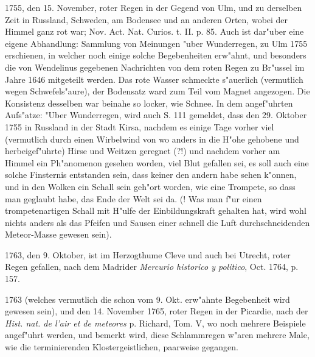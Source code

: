 \documentclass[a4paper, 11pt, oneside, polutonikogreek, german]{article}
\begin{document}
1755, den 15. November, roter Regen in der Gegend von Ulm, und zu derselben Zeit in Russland, Schweden, am Bodensee und an anderen Orten, wobei der Himmel ganz rot war; Nov. Act. Nat. Curios. t. II. p. 85. Auch ist dar"uber eine eigene Abhandlung: Sammlung von Meinungen "uber Wunderregen, zu Ulm 1755 erschienen, in welcher noch einige solche Begebenheiten erw"ahnt, und besonders die von Wendelinus gegebenen Nachrichten von dem roten Regen zu Br"ussel im Jahre 1646 mitgeteilt werden. Das rote Wasser schmeckte s"auerlich (vermutlich wegen Schwefels"aure), der Bodensatz ward zum Teil vom Magnet angezogen. Die Konsistenz desselben war beinahe so locker, wie Schnee. In dem angef"uhrten Aufs"atze: "Uber Wunderregen, wird auch S. 111 gemeldet, dass den 29. Oktober 1755 in Russland in der Stadt Kirsa, nachdem es einige Tage vorher viel (vermutlich durch einen Wirbelwind von wo anders in die H"ohe gehobene und herbeigef"uhrte) Hirse und Weitzen geregnet (?!) und nachdem vorher am Himmel ein Ph"anomenon gesehen worden, viel Blut gefallen sei, es soll auch eine solche Finsternis entstanden sein, dass keiner den andern habe sehen k"onnen, und in den Wolken ein Schall sein geh"ort worden, wie eine Trompete, so dass man geglaubt habe, das Ende der Welt sei da. (! Was man f"ur einen trompetenartigen Schall mit H"ulfe der Einbildungskraft gehalten hat, wird wohl nichts anders als das Pfeifen und Sausen einer schnell die Luft durchschneidenden Meteor-Masse gewesen sein).

1763, den 9. Oktober, ist im Herzogthume Cleve und auch bei Utrecht, roter Regen gefallen, nach dem Madrider \emph{Mercurio historico y politico}, Oct. 1764, p. 157.

1763 (welches vermutlich die schon vom 9. Okt. erw"ahnte Begebenheit wird gewesen sein), und den 14. November 1765, roter Regen in der Picardie, nach der \emph{Hist. nat. de l'air et de meteores} p. Richard, Tom. V, wo noch mehrere Beispiele angef"uhrt werden, und bemerkt wird, diese Schlammregen w"aren mehrere Male, wie die terminierenden Klostergeistlichen, paarweise gegangen.
\end{document}
